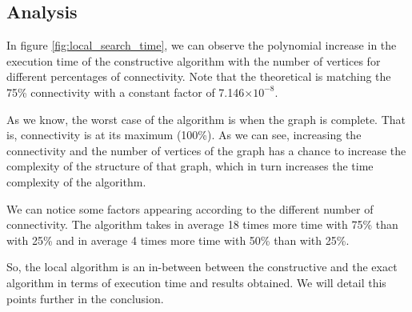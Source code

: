 
    \subsection{Analysis}

    In figure \ref{fig:local_search_time}, we can observe the polynomial increase in the execution time of the constructive algorithm with the number of vertices for different percentages of connectivity. Note that the theoretical is matching the 75\% connectivity with a constant factor of 7.146$\times10^{-8}$.
    \bigskip
    
    As we know, the worst case of the algorithm is when the graph is complete. That is, connectivity is at its maximum (100\%). As we can see, increasing the connectivity and the number of vertices of the graph has a chance to increase the complexity of the structure of that graph, which in turn increases the time complexity of the algorithm. 
    \bigskip
    
    We can notice some factors appearing according to the different number of connectivity. The algorithm takes in average 18 times more time with 75\% than with 25\% and in average 4 times more time with 50\% than with 25\%.
    \bigskip
    
    So, the local algorithm is an in-between between the constructive and the exact algorithm in terms of execution time and results obtained. We will detail this points further in the conclusion.